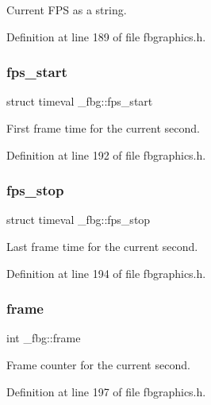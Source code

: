Current F\+PS as a string. 



Definition at line 189 of file fbgraphics.\+h.

\mbox{\label{struct__fbg_a07d7bb827a7595c956fe22c2d65bba33}} 
\subsubsection{\texorpdfstring{fps\+\_\+start}{fps\_start}}
{\footnotesize\ttfamily struct timeval \+\_\+fbg\+::fps\+\_\+start}



First frame time for the current second. 



Definition at line 192 of file fbgraphics.\+h.

\mbox{\label{struct__fbg_ade17a45bbc82bef326857c2837cdf66c}} 
\subsubsection{\texorpdfstring{fps\+\_\+stop}{fps\_stop}}
{\footnotesize\ttfamily struct timeval \+\_\+fbg\+::fps\+\_\+stop}



Last frame time for the current second. 



Definition at line 194 of file fbgraphics.\+h.

\mbox{\label{struct__fbg_aa3ef83f919d12e680f8c64006b441454}} 
\subsubsection{\texorpdfstring{frame}{frame}}
{\footnotesize\ttfamily int \+\_\+fbg\+::frame}



Frame counter for the current second. 



Definition at line 197 of file fbgraphics.\+h.

